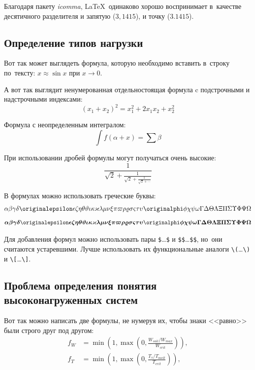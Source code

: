 Благодаря пакету \textit{icomma}, \LaTeX~одинаково хорошо воспринимает
в~качестве десятичного разделителя и запятую (\(3,1415\)), и точку (\(3.1415\)).

\subsection{Определение типов нагрузки}\label{subsec:ch1/sec3/sub1}

Вот так может выглядеть формула, которую необходимо вставить в~строку
по~тексту: \(x \approx \sin x\) при \(x \to 0\).

А вот так выглядит ненумерованная отдельностоящая формула c подстрочными
и надстрочными индексами:
\[
    (x_1+x_2)^2 = x_1^2 + 2 x_1 x_2 + x_2^2
\]

Формула с неопределенным интегралом:
\[
    \int f(\alpha+x)=\sum\beta
\]

При использовании дробей формулы могут получаться очень высокие:
\[
    \frac{1}{\sqrt{2}+
        \displaystyle\frac{1}{\sqrt{2}+
            \displaystyle\frac{1}{\sqrt{2}+\cdots}}}
\]

В формулах можно использовать греческие буквы:
\[
    \alpha\beta\gamma\delta\originalepsilon\epsilon\zeta\eta\theta%
    \vartheta\iota\kappa\varkappa\lambda\mu\nu\xi\pi\varpi\rho\varrho%
    \sigma\varsigma\tau\upsilon\originalphi\phi\chi\psi\omega\Gamma\Delta%
    \Theta\Lambda\Xi\Pi\Sigma\Upsilon\Phi\Psi\Omega
\]
\[%
    \boldsymbol{\alpha\beta\gamma\delta\originalepsilon\epsilon\zeta\eta%
        \theta\vartheta\iota\kappa\varkappa\lambda\mu\nu\xi\pi\varpi\rho%
        \varrho\sigma\varsigma\tau\upsilon\originalphi\phi\chi\psi\omega\Gamma%
        \Delta\Theta\Lambda\Xi\Pi\Sigma\Upsilon\Phi\Psi\Omega}
\]

Для добавления формул можно использовать пары \verb+$+\dots\verb+$+ и \verb+$$+\dots\verb+$$+,
но~они считаются устаревшими.
Лучше использовать их функциональные аналоги \verb+\(+\dots\verb+\)+ и \verb+\[+\dots\verb+\]+.

\subsection{Проблема определения понятия высоконагруженных систем}\label{subsec:ch1/sec3/sub2}

Вот так можно написать две формулы, не нумеруя их, чтобы знаки <<равно>> были
строго друг под другом:
\begin{align}
    f_W & =  \min \left( 1, \max \left( 0, \frac{W_{soil} / W_{max}}{W_{crit}} \right)  \right), \nonumber \\
    f_T & =  \min \left( 1, \max \left( 0, \frac{T_s / T_{melt}}{T_{crit}} \right)  \right), \nonumber
\end{align}

